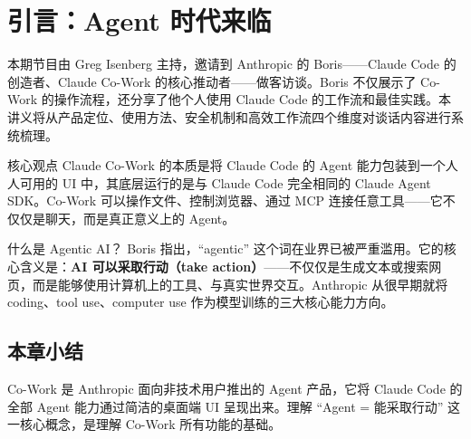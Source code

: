 \section{引言：Agent 时代来临}

本期节目由 Greg Isenberg 主持，邀请到 Anthropic 的 Boris——Claude Code 的创造者、Claude Co-Work 的核心推动者——做客访谈。Boris 不仅展示了 Co-Work 的操作流程，还分享了他个人使用 Claude Code 的工作流和最佳实践。本讲义将从产品定位、使用方法、安全机制和高效工作流四个维度对谈话内容进行系统梳理。

\begin{importantbox}{核心观点}
Claude Co-Work 的本质是将 Claude Code 的 Agent 能力包装到一个人人可用的 UI 中，其底层运行的是与 Claude Code 完全相同的 Claude Agent SDK。Co-Work 可以操作文件、控制浏览器、通过 MCP 连接任意工具——它不仅仅是聊天，而是真正意义上的 Agent。
\end{importantbox}

\begin{knowledgebox}{什么是 Agentic AI？}
Boris 指出，``agentic'' 这个词在业界已被严重滥用。它的核心含义是：\textbf{AI 可以采取行动（take action）}——不仅仅是生成文本或搜索网页，而是能够使用计算机上的工具、与真实世界交互。Anthropic 从很早期就将 coding、tool use、computer use 作为模型训练的三大核心能力方向。
\end{knowledgebox}

\subsection{本章小结}

Co-Work 是 Anthropic 面向非技术用户推出的 Agent 产品，它将 Claude Code 的全部 Agent 能力通过简洁的桌面端 UI 呈现出来。理解 ``Agent = 能采取行动'' 这一核心概念，是理解 Co-Work 所有功能的基础。

